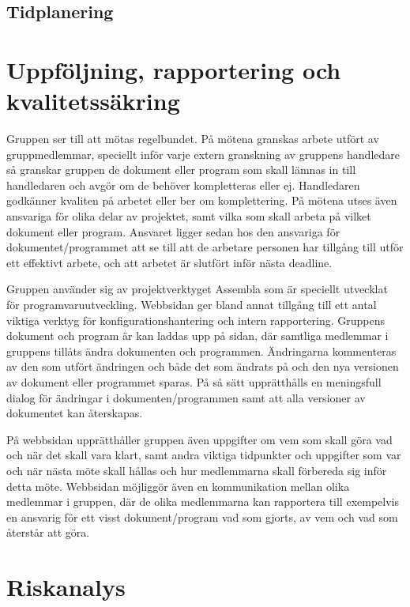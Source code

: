 \documentclass[a4paper]{article}
\begin{document}
\subsection{Tidplanering} %

\section{Uppföljning, rapportering och kvalitetssäkring} %
Gruppen ser till att mötas regelbundet. På mötena granskas arbete utfört av gruppmedlemmar, speciellt inför
varje extern granskning av gruppens handledare så granskar gruppen de dokument eller program som 
skall lämnas in till handledaren och avgör om de behöver kompletteras eller ej. Handledaren godkänner kvaliten på
arbetet eller ber om komplettering. På mötena utses även ansvariga för olika delar av projektet, samt vilka som skall 
arbeta på vilket dokument eller program. Ansvaret ligger sedan hos den ansvariga för dokumentet/programmet att se till
att de arbetare personen har tillgång till utför ett effektivt arbete, och att arbetet är slutfört inför nästa deadline.

Gruppen använder sig av projektverktyget Assembla som är speciellt utvecklat för programvaruutveckling. 
Webbsidan ger bland annat tillgång  till ett antal viktiga verktyg för konfigurationshantering och intern rapportering.
Gruppens dokument och program är kan laddas upp på sidan, där samtliga medlemmar i gruppens tillåts ändra dokumenten
och programmen. Ändringarna kommenteras av den som utfört ändringen och både det som ändrats på och den nya 
versionen av dokument eller programmet sparas. På så sätt  upprätthålls en meningsfull dialog för ändringar i dokumenten/programmen
samt att alla versioner av dokumentet kan återskapas. 

På webbsidan upprätthåller gruppen även uppgifter om vem som skall göra vad och när det skall vara klart, samt andra viktiga 
tidpunkter och uppgifter som var och när nästa möte skall hållas och hur medlemmarna skall förbereda sig inför detta möte. Webbsidan möjliggör även en
kommunikation mellan olika medlemmar i gruppen, där de olika medlemmarna kan rapportera till exempelvis en ansvarig för ett visst
dokument/program vad som gjorts, av vem och vad som återstår att göra.


\section{Riskanalys}
\end{document}
